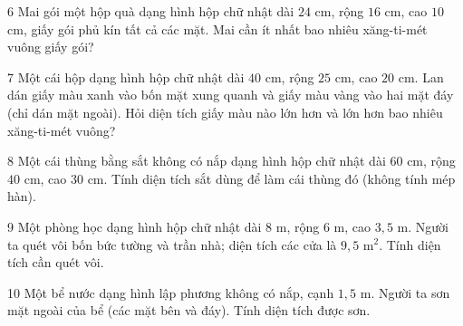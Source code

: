 \gap
\begin{probbox}{6}{\relax}
Mai gói một hộp quà dạng hình hộp chữ nhật dài $24$ cm, rộng $16$ cm, cao $10$ cm, giấy gói phủ kín tất cả các mặt. Mai cần ít nhất bao nhiêu xăng-ti-mét vuông giấy gói?
\end{probbox}
\gap
\begin{probbox}{7}{\relax}
Một cái hộp dạng hình hộp chữ nhật dài $40$ cm, rộng $25$ cm, cao $20$ cm. Lan dán giấy màu xanh vào bốn mặt xung quanh và giấy màu vàng vào hai mặt đáy (chỉ dán mặt ngoài). Hỏi diện tích giấy màu nào lớn hơn và lớn hơn bao nhiêu xăng-ti-mét vuông?
\end{probbox}
\gap
\begin{probbox}{8}{\relax}
Một cái thùng bằng sắt không có nắp dạng hình hộp chữ nhật dài $60$ cm, rộng $40$ cm, cao $30$ cm. Tính diện tích sắt dùng để làm cái thùng đó (không tính mép hàn).
\end{probbox}
\gap
\begin{probbox}{9}{\relax}
Một phòng học dạng hình hộp chữ nhật dài $8$ m, rộng $6$ m, cao $3{,}5$ m. Người ta quét vôi bốn bức tường và trần nhà; diện tích các cửa là $9{,}5$ m$^2$. Tính diện tích cần quét vôi.
\end{probbox}
\gap
\begin{probbox}{10}{\relax}
Một bể nước dạng hình lập phương không có nắp, cạnh $1{,}5$ m. Người ta sơn mặt ngoài của bể (các mặt bên và đáy). Tính diện tích được sơn.
\end{probbox}
